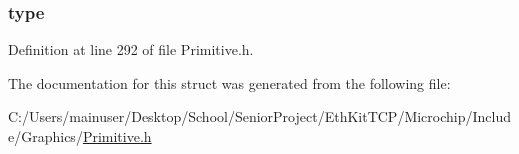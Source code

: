 \subsubsection[{type}]{ type}\label{struct_i_m_a_g_e___f_l_a_s_h_ad19c8e0d19c638be9dd81d163454b0f1}


Definition at line 292 of file Primitive.\+h.



The documentation for this struct was generated from the following file\+:\begin{DoxyCompactItemize}
\item 
C\+:/\+Users/mainuser/\+Desktop/\+School/\+Senior\+Project/\+Eth\+Kit\+T\+C\+P/\+Microchip/\+Include/\+Graphics/\hyperlink{_primitive_8h}{Primitive.\+h}\end{DoxyCompactItemize}
